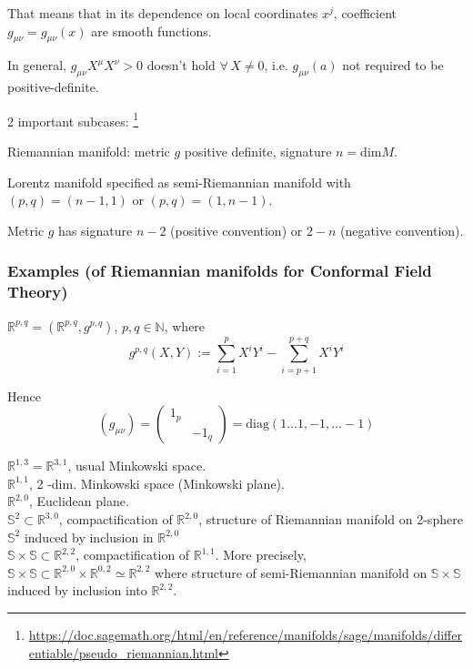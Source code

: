 \documentclass[10pt]{amsart}
\begin{document}
\begin{multicols*}{2}
That means that in its dependence on local coordinates $x^j$, coefficient $g_{\mu \nu} = g_{\mu \nu}(x)$ are smooth functions.

In general, $g_{\mu \nu}X^{\mu} X^{\nu} >0 $ doesn't hold $\forall \, X \neq 0$, i.e. $g_{\mu \nu}(a)$ not required to be positive-definite.

2 important subcases: \footnote{\url{https://doc.sagemath.org/html/en/reference/manifolds/sage/manifolds/differentiable/pseudo_riemannian.html}}

Riemannian manifold: metric $g$ positive definite, signature $n= \text{dim}M$. 

Lorentz manifold specified as semi-Riemannian manifold with $(p,q)= (n-1,1)$ or $(p,q) = (1, n-1)$. 

Metric $g$ has signature $n-2$ (positive convention) or $2-n$ (negative convention).

\subsubsection{Examples (of Riemannian manifolds for Conformal Field Theory)}

$\mathbb{R}^{p,q} = (\mathbb{R}^{p,q}, g^{p,q})$, $p,q \in \mathbb{N}$, where
\[
g^{p,q}(X,Y) := \sum_{i=1}^p X^i Y^i - \sum_{i = p+1}^{p+q} X^i Y^i
\]

Hence
\[
(g_{\mu \nu}) = \left( \begin{matrix} 1_p & \\ & -1_q \end{matrix} \right) = \text{diag}(1\dots 1, -1, \dots  -1)
\]

$\mathbb{R}^{1,3} = \mathbb{R}^{3,1}$, usual Minkowski space. \\
$\mathbb{R}^{1,1}$, 2 -dim. Minkowski space (Minkowski plane). \\
$\mathbb{R}^{2,0}$, Euclidean plane. \\
$\mathbb{S}^2 \subset \mathbb{R}^{3,0}$, compactification of $\mathbb{R}^{2,0}$, structure of Riemannian manifold on 2-sphere $\mathbb{S}^2$ induced by inclusion in $\mathbb{R}^{2,0}$ \\
$\mathbb{S} \times \mathbb{S} \subset \mathbb{R}^{2,2}$, compactification of $\mathbb{R}^{1,1}$. More precisely, \\
$\mathbb{S} \times \mathbb{S} \subset \mathbb{R}^{2,0} \times \mathbb{R}^{0,2} \simeq \mathbb{R}^{2,2}$ where structure of semi-Riemannian manifold on $\mathbb{S} \times \mathbb{S}$ induced by inclusion into $\mathbb{R}^{2,2}$. 


\end{multicols*}
\end{document}
